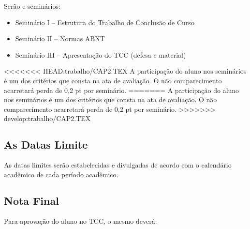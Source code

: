 Serão e seminários:
	\begin{itemize}
		\item Seminário I – Estrutura do Trabalho de Conclusão de Curso

		\item Seminário II – Normas ABNT

		\item Seminário III – Apresentação do TCC (defesa e material)
	\end{itemize}

<<<<<<< HEAD:trabalho/CAP2.TEX
A participação do aluno nos seminários é um dos critérios que consta na ata de avaliação. O não comparecimento acarretará perda de 0,2 pt por seminário.
=======
A participação do aluno nos seminários \'e um dos crit\'erios que consta na ata de avaliação. O não comparecimento acarretará perda de 0,2 pt por seminário.
>>>>>>> develop:trabalho/CAP2.TEX


\subsection{As Datas Limite}

As datas limites serão estabelecidas e divulgadas de acordo com o calendário acadêmico de cada período acadêmico.


\subsection{Nota Final}

Para aprovação do aluno no TCC, o mesmo deverá:




